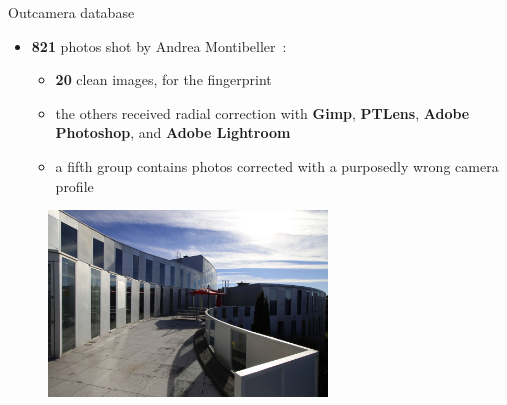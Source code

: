 \begin{frame}{Outcamera database}

    \begin{itemize}
        \item<1-> \textbf{821} photos shot by Andrea Montibeller~\cite{montibeller}: \begin{itemize}
            \item<2-> \textbf{20} clean images, for the fingerprint
            \item<3-> the others received radial correction with \textbf{Gimp}, \textbf{PTLens}, \textbf{Adobe Photoshop}, and \textbf{Adobe Lightroom}
            \item<4-> a fifth group contains photos corrected with a purposedly wrong camera profile
        \end{itemize}
    \end{itemize}
    
    \begin{figure}
        \centering
        \includegraphics[width=0.66\textwidth]{../drawable/examples/example-outcamera-im24.jpg}
    \end{figure}
    
\end{frame}


